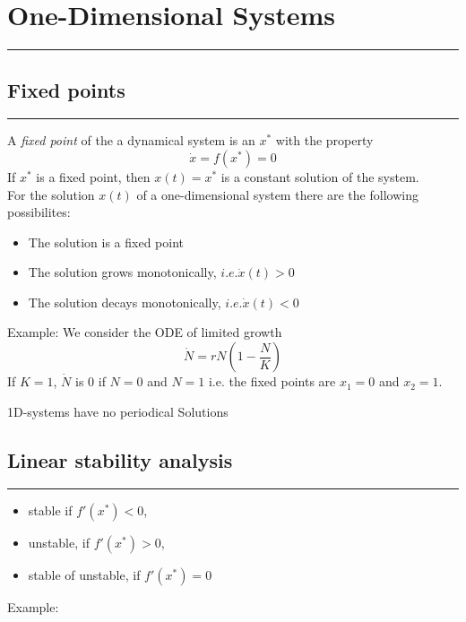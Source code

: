 \section{One-Dimensional Systems}
\noindent\rule[\linienAbstand]{\linewidth}{\linienDickeDick}

\subsection{Fixed points}
\noindent\rule[\linienAbstand]{\linewidth}{\linienDicke}
A \emph{fixed point} of the a dynamical system is an $x^*$ with the property
\begin{equation}
  \dot{x} = f(x^*) = 0
\end{equation}
If $x^*$ is a fixed point, then $x(t) = x^*$ is a constant solution of the system.\\

For the solution $x(t)$ of a one-dimensional system there are the following possibilites:
\begin{itemize}
  \item The solution is a fixed point
  \item The solution grows monotonically, $i.e. \dot{x}(t) > 0$
  \item The solution decays monotonically, $i.e. \dot{x}(t) < 0$
\end{itemize}

Example: We consider the ODE of limited growth
\begin{equation}
  \dot{N} = rN\left(1-\frac{N}{K}\right)
\end{equation}
If $K = 1$, $\dot{N}$ is $0$ if $N = 0$ and $N = 1$ i.e. the fixed points are $x_1 = 0$ and $x_2 = 1$. 

1D-systems have no periodical Solutions

\subsection{Linear stability analysis}
\noindent\rule[\linienAbstand]{\linewidth}{\linienDicke}
\begin{itemize}
  \item stable if $f'(x^*) < 0$,
  \item unstable, if $f'(x^*) > 0$,
  \item stable of unstable, if $f'(x^*) = 0$
\end{itemize}

Example:

